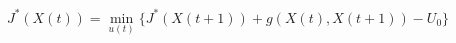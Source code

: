 \documentclass[]{article}
\title{}
\author{}
\begin{document}
\maketitle

\begin{abstract}

\end{abstract}

\section{}


\begin{align}
	J^{*}(X(t)) = \min_{u(t)} \biggl\{{ J^{*}(X(t+1)) + g(X(t), X(t+1)) - U_0}\biggr\}
\end{align}
\end{document}
